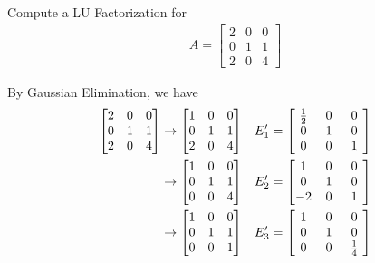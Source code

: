 \begin{exmp}
Compute a LU Factorization for
\begin{align*}
A = 
\begin{bmatrix}
2 & 0 & 0 \\
0 & 1 & 1 \\
2 & 0 & 4
\end{bmatrix}
\end{align*}
\end{exmp}
\begin{solution}
By Gaussian Elimination, we have
\begin{align*}
\begin{bmatrix}
2 & 0 & 0 \\
0 & 1 & 1 \\
2 & 0 & 4
\end{bmatrix}
&\rightarrow 
\begin{bmatrix}
1 & 0 & 0 \\
0 & 1 & 1 \\
2 & 0 & 4 
\end{bmatrix}
& E_1' =
\left[\begin{array}{@{\,}wc{10pt}wc{10pt}wc{10pt}@{\,}}
\frac{1}{2} & 0 & 0 \\
0 & 1 & 0 \\
0 & 0 & 1 \\
\end{array}\right]
\\
&\rightarrow 
\begin{bmatrix}
1 & 0 & 0 \\
0 & 1 & 1 \\
0 & 0 & 4 
\end{bmatrix}
&
E_2' =
\left[\begin{array}{@{\,}wc{10pt}wc{10pt}wc{10pt}@{\,}}
1 & 0 & 0 \\
0 & 1 & 0 \\
-2 & 0 & 1 
\end{array}\right]
\\
&\rightarrow 
\begin{bmatrix}
1 & 0 & 0 \\
0 & 1 & 1 \\
0 & 0 & 1
\end{bmatrix}
&
E_3' = 
\left[\begin{array}{@{\,}wc{10pt}wc{10pt}wc{10pt}@{\,}}
1 & 0 & 0 \\
0 & 1 & 0 \\
0 & 0 & \frac{1}{4}
\end{array}\right]
\end{align*}

\end{solution}
